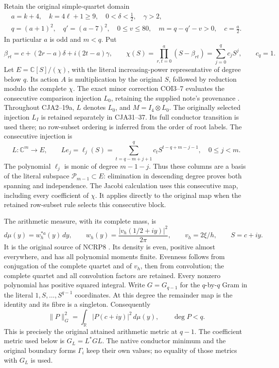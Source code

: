 \documentclass[11pt,a4paper]{article}
\begin{document}
Retain the original simple-quartet domain
\[
\begin{gathered}
 a=k+4,\quad k=4\ell+1\geq9,\quad
 0<\delta<\tfrac12,\quad \gamma>2,\\
 q=(a+1)^2,\quad q'=(a-7)^2,\quad
 0\leq v\leq80,\quad m=q-q'-v>0,\quad c=\tfrac a2.
\end{gathered}
\]
In particular \(a\) is odd and \(m<q\).
Put
\begin{equation}
 \beta_{rt}=c+(2r-a)\delta+i(2t-a)\gamma,\qquad
 \chi(S)=\prod_{r,t=0}^{a}(S-\beta_{rt})
        =\sum_{j=0}^q c_jS^j,\qquad c_q=1 .
 \tag{CJA1}
\end{equation}
Let \(E=\mathbb C[S]/(\chi)\), with the literal increasing-power
representative of degree below \(q\).  Its action \(A\) is multiplication
by the original \(S\), followed by reduction modulo the complete \(\chi\).
The exact minor correction COI3--7 evaluates the consecutive
comparison injection \(L_0\), retaining the supplied note's provenance
\cite{a03cm:program:arrival03-01}.
Throughout CJA2--19a, \(L\) denotes \(L_0\), and
\(M=I_4\otimes L_0\).  The originally selected injection \(L_I\)
is retained separately in CJA31--37.
Its full conductor transition is used there; no row-subset ordering
is inferred from the order of root labels.
The consecutive injection is
\begin{equation}
 L:\mathbb C^m\longrightarrow E,\qquad
 Le_j=\ell_j(S)=
 \sum_{t=q-m+j+1}^{q}c_tS^{t-q+m-j-1},\quad 0\leq j<m .
 \tag{CJA2}
\end{equation}
The polynomial \(\ell_j\) is monic of degree \(m-1-j\).
Thus these columns are a basis of the literal subspace
\(\mathcal P_{m-1}\subset E\): elimination in descending degree proves
both spanning and independence.  The Jacobi calculation uses this
consecutive map, including every coefficient of \(\chi\).
It applies directly to the original map when the retained row-subset
rule selects this consecutive block.

The arithmetic measure, with its complete mass, is
\begin{equation}
 d\mu(y)=w_h^{*a}(y)\,dy,\qquad
 w_h(y)=\frac{|v_h(1/2+iy)|^2}{2\pi},\qquad
 v_h=2\xi/h,\qquad S=c+iy .
 \tag{CJA3}
\end{equation}
It is the original source of NCRP8 \cite{a03cm:prog:NCRP}.
Its density is even, positive almost everywhere, and has all polynomial
moments finite.  Evenness follows from conjugation of the complete
quartet and of \(v_h\), then from convolution; the complete quartet and
all convolution factors are retained.
Every nonzero polynomial has positive squared integral.
Write \(G=G_{q-1}\) for the \(q\)-by-\(q\) Gram in the literal
\(1,S,\ldots,S^{q-1}\) coordinates.
At this degree the remainder map is the identity and its fibre is a
singleton.  Consequently
\begin{equation}
 \|P\|_G^2=\int_{\mathbb R}|P(c+iy)|^2\,d\mu(y),
 \qquad \deg P<q.
 \tag{CJA4}
\end{equation}
This is precisely the original attained arithmetic metric at \(q-1\).
The coefficient metric used below is \(G_L=L^*GL\).
The native conductor minimum and the original boundary forms
\(\Gamma_i\) keep their own values; no equality of those metrics with
\(G_L\) is used.
\end{document}
